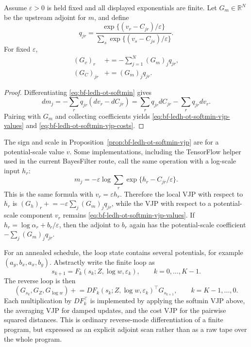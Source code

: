 \begin{proposition}
\label{prop:bf-ledh-ot-softmin-vjp}
Assume \(\varepsilon>0\) is held fixed and all displayed exponentials are
finite.  Let \(G_m\in\mathbb R^N\) be the upstream adjoint for \(m\), and define
\[
  q_{jr}
  =
  \frac{\exp\{(v_r-C_{jr})/\varepsilon\}}
       {\sum_s \exp\{(v_s-C_{js})/\varepsilon\}}.
\]
For fixed \(\varepsilon\),
\begin{align}
\label{eq:bf-ledh-ot-softmin-vjp-values}
  (G_v)_r
  &\mathrel{+}=
  -\sum_{j=1}^N (G_m)_j q_{jr},\\
\label{eq:bf-ledh-ot-softmin-vjp-costs}
  (G_C)_{jr}
  &\mathrel{+}=
  (G_m)_j q_{jr}.
\end{align}
\end{proposition}

\begin{proof}
Differentiating \eqref{eq:bf-ledh-ot-softmin} gives
\[
  dm_j
  =
  -\sum_r q_{jr}(dv_r-dC_{jr})
  =
  \sum_r q_{jr}dC_{jr}-\sum_r q_{jr}dv_r.
\]
Pairing with \(G_m\) and collecting coefficients yields
\eqref{eq:bf-ledh-ot-softmin-vjp-values} and
\eqref{eq:bf-ledh-ot-softmin-vjp-costs}.
\end{proof}

The sign and scale in Proposition~\ref{prop:bf-ledh-ot-softmin-vjp} are for a
potential-scale value \(v\).  Some implementations, including the TensorFlow
helper used in the current BayesFilter route, call the same operation with a
log-scale input \(h_r\):
\[
  m_j=-\varepsilon\log\sum_r
  \exp\{h_r-C_{jr}/\varepsilon\}.
\]
This is the same formula with \(v_r=\varepsilon h_r\).  Therefore the local VJP
with respect to \(h_r\) is \((G_h)_r\mathrel{+}=
-\varepsilon\sum_j(G_m)_j q_{jr}\), while the VJP with respect to a
potential-scale component \(v_r\) remains
\eqref{eq:bf-ledh-ot-softmin-vjp-values}.  If \(h_r=\log\alpha_r+b_r/\varepsilon\),
then the adjoint to \(b_r\) again has the potential-scale coefficient
\(-\sum_j(G_m)_j q_{jr}\).

For an annealed schedule, the loop state contains several potentials, for
example \((a_y,b_x,a_x,b_y)\).  Abstractly write the finite loop as
\begin{equation}
\label{eq:bf-ledh-ot-loop-state}
  s_{k+1}=F_k(s_k;Z,\log w,\varepsilon_k),
  \qquad k=0,\ldots,K-1.
\end{equation}
The reverse loop is then
\begin{equation}
\label{eq:bf-ledh-ot-reverse-loop}
  (G_{s_k},G_Z,G_{\log w})
  \mathrel{+}=
  D F_k(s_k;Z,\log w,\varepsilon_k)^\top G_{s_{k+1}},
  \qquad k=K-1,\ldots,0.
\end{equation}
Each multiplication by \(D F_k^\top\) is implemented by applying the softmin
VJP above, the averaging VJP for damped updates, and the cost VJP for the
pairwise squared distances.  This is ordinary reverse-mode differentiation of a
finite program, but expressed as an explicit adjoint scan rather than as a raw
tape over the whole program.

